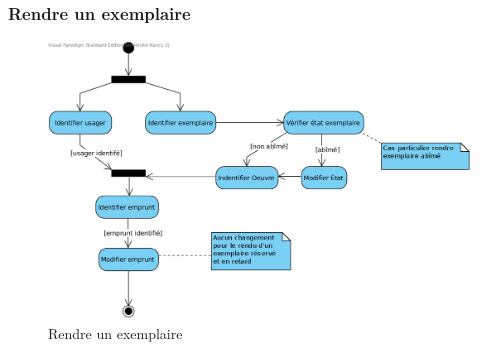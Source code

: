 \documentclass[a4paper,12pt]{article}
\begin{document}
\clearpage
\subsubsection{Rendre un exemplaire}
\label{sec:orgheadline28}

\begin{figure}[htb]
\centering
\includegraphics[width=.9\linewidth]{./res/img/rendre-un-exemplaire.png}
\caption{\label{fig:orgparagraph19}
Rendre un exemplaire}
\end{figure}
\end{document}
